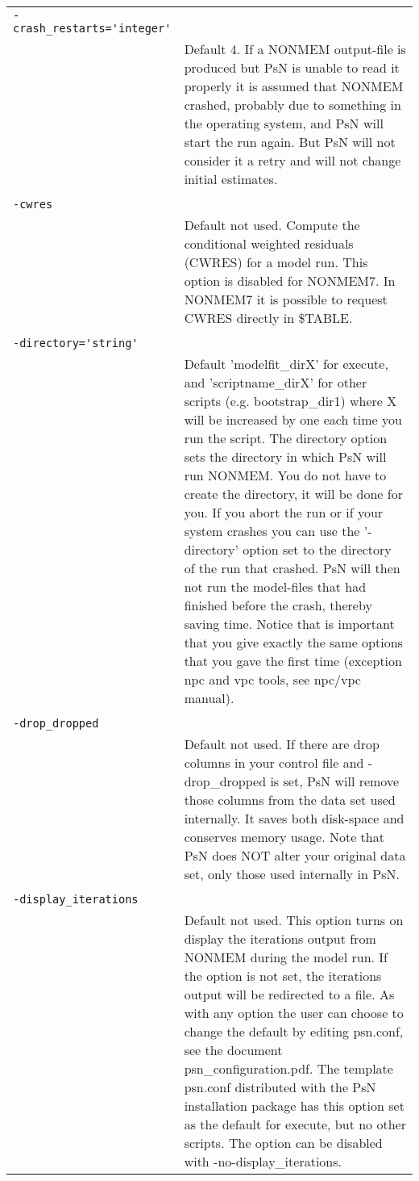 \documentclass[a4paper,12pt]{article}
\begin{document}
\begin{longtable}{p{1in}p{4in}}
\\
\verb|-crash_restarts='integer'| & \\
\nopagebreak
 & Default 4. If a NONMEM output-file is produced but PsN is unable to read it properly it is assumed that NONMEM crashed, probably due to something in the operating system, and PsN will start the run again. But PsN will not consider it a retry and will not change initial estimates. \\
\\
\verb|-cwres| & \\
\nopagebreak
 & Default not used. Compute the conditional weighted residuals (CWRES) for a model run. This option is disabled for NONMEM7. In NONMEM7 it is possible to request CWRES directly in \$TABLE. \\
\\
\verb|-directory='string'| & \\
\nopagebreak
 & Default 'modelfit\_dirX' for execute, and 'scriptname\_dirX' for other scripts (e.g. bootstrap\_dir1) where X will be increased by one each time you run the script. The directory option sets the directory in which PsN will run  NONMEM. You do not have to create the directory,  it will be done for you. If you abort the run or if your system crashes you can use the '-directory' option set to the directory of the run that crashed. PsN will then not run the model-files that had finished before the crash, thereby saving time. Notice that is important that you give exactly the same options that you gave the first time (exception npc and vpc tools, see npc/vpc manual). \\
\\
\verb|-drop_dropped| & \\
\nopagebreak
 & Default not used. If there are drop columns in your control file and -drop\_dropped is set, PsN will remove those columns from the data set used internally. It saves both disk-space and conserves memory usage. Note that PsN does NOT alter your original data set, only those used internally in PsN. \\
\\
\verb|-display_iterations| & \\
\nopagebreak
 & Default not used.  This option turns on display the iterations output from NONMEM during the model run. If the option is not set, the iterations output will be redirected to a file. As with any option the user can choose to change the default by editing psn.conf, see the document psn\_configuration.pdf. The template psn.conf distributed with the PsN installation package has this option set as the default for execute, but no other scripts. The option can be disabled with -no-display\_iterations. \\

\end{longtable}
\end{document}
